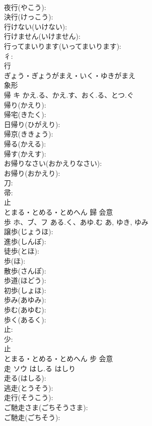 \documentclass[8pt]{extreport}
\begin{document}
\begin{CJK}{UTF8}{min}
\\	夜行(やこう): 
\\	決行(けっこう): 
\\	行けない(いけない): 
\\	行けません(いけません): 
\\	行ってまいります(いってまいります): 
\\	彳: 
\\	行	
\\	ぎょう・ぎょうがまえ・いく・ゆきがまえ	
\\	象形 
\\	帰	キ	かえ.る、かえ.す、おく.る、とつ.ぐ		
\\	帰り(かえり): 
\\	帰宅(きたく): 
\\	日帰り(ひがえり): 
\\	帰京(ききょう): 
\\	帰る(かえる): 
\\	帰す(かえす): 
\\	お帰りなさい(おかえりなさい): 
\\	お帰り(おかえり): 
\\	刀: 
\\	帚: 
\\	止	
\\	とまる・とめる・とめへん	歸	会意 
\\	歩	ホ、ブ、フ	ある.く、あゆ.む	あ, ゆき, ゆみ	
\\	譲歩(じょうほ): 
\\	進歩(しんぽ): 
\\	徒歩(とほ): 
\\	歩(ほ): 
\\	散歩(さんぽ): 
\\	歩道(ほどう): 
\\	初歩(しょほ): 
\\	歩み(あゆみ): 
\\	歩む(あゆむ): 
\\	歩く(あるく): 
\\	止: 
\\	少: 
\\	止	
\\	とまる・とめる・とめへん	步	会意 
\\	走	ソウ	はし.る	はしり	
\\	走る(はしる): 
\\	逃走(とうそう): 
\\	走行(そうこう): 
\\	ご馳走さま(ごちそうさま): 
\\	ご馳走(ごちそう): 

\end{CJK}
\end{document}
